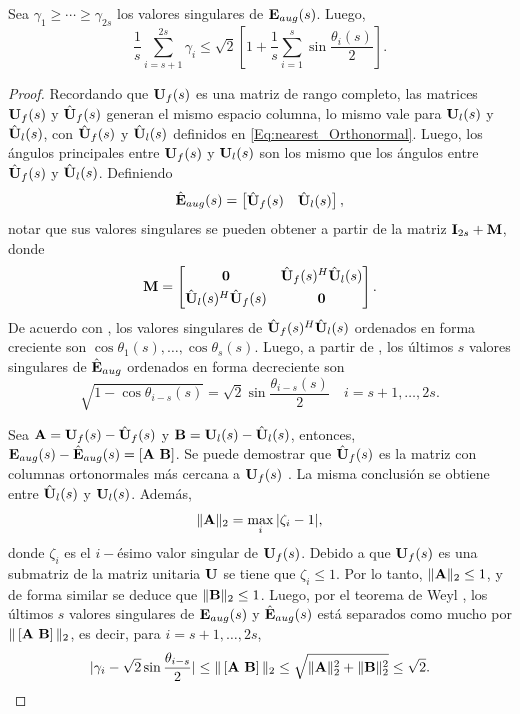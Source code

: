 \begin{theorem}\label{The1:SAMOS}
	Sea $\gamma_1\ge\cdots\ge\gamma_{2s}$ los valores singulares de $\mathbf{E}_{aug}(s)$. Luego,
	\begin{equation}
		\frac{1}{s}\sum_{i=s+1}^{2s}\gamma_i\le \sqrt{2}\left[1+\frac{1}{s}\sum_{i=1}^s\sin\frac{\theta_{i}(s)}{2}\right].
		\label{eq:Angle_Weyl}
	\end{equation}
\end{theorem}
\begin{proof}
	Recordando que $\mathbf{U}_f(s)$ es una matriz de rango completo, las matrices $\mathbf{U}_f(s)$ y $\hat{\mathbf{U}}_f(s)$ generan el mismo espacio columna, lo mismo vale para $\mathbf{U}_l(s)$ y $\hat{\mathbf{U}}_l(s)$, con $\hat{\mathbf{U}}_f(s)$ y $\hat{\mathbf{U}}_l(s)$ definidos en \eqref{Eq:nearest_Orthonormal}. Luego, los ángulos principales entre $\mathbf{U}_f(s)$ y $\mathbf{U}_l(s)$ son los mismo que los ángulos entre $\hat{\mathbf{U}}_f(s)$ y $\hat{\mathbf{U}}_l(s)$. Definiendo
	\begin{equation}
		\hat{\mathbf{E}}_{aug}(s) = \begin{bmatrix} \hat{\mathbf{U}}_f(s) & \hat{\mathbf{U}}_l(s)\end{bmatrix},
	\end{equation}
	notar que sus valores singulares se pueden obtener a partir de la matriz $\mathbf{I}_{2s}+\mathbf{M}$, donde
	\[\mathbf{M} = \begin{bmatrix} \mathbf{0} & \hat{\mathbf{U}}_f(s)^H\hat{\mathbf{U}}_l(s)\\[0.3em] \hat{\mathbf{U}}_l(s)^H\hat{\mathbf{U}}_f(s) & \mathbf{0}
	\end{bmatrix}.\]
	De acuerdo con \cite[Teorema I.5.2]{Stewart1990}, los valores singulares de $\hat{\mathbf{U}}_f(s)^H\hat{\mathbf{U}}_l(s)$ ordenados en forma creciente son $\cos\theta_1(s),\ldots,\cos\theta_s(s)$. Luego, a partir de \cite[Teorema 7.3.3]{Horn1990}, los últimos $s$ valores singulares de $\hat{\mathbf{E}}_{aug}$ ordenados en forma decreciente son
	\[\sqrt{1-\cos\theta_{i-s}(s)} = \sqrt{2}\sin\frac{\theta_{i-s}(s)}{2}\quad i= s+1,\ldots,2s.\]
	
	Sea $\mathbf{A} = \mathbf{U}_f(s) - \hat{\mathbf{U}}_f(s)$ y $\mathbf{B} = \mathbf{U}_l(s) - \hat{\mathbf{U}}_l(s)$, entonces, $\mathbf{E}_{aug}(s) - \hat{\mathbf{E}}_{aug}(s) = \left[ \mathbf{A}\  \mathbf{B}\right]$. Se puede demostrar que $\hat{\mathbf{U}}_f(s)$ es la matriz con columnas ortonormales más cercana a  $\mathbf{U}_f(s)$ \cite{Higham89}. La misma conclusión se obtiene entre $\hat{\mathbf{U}}_l(s)$ y $\mathbf{U}_l(s)$. Además,
	\[\|\mathbf{A}\|_2 = \max_{i}|\zeta_i-1|,\]
	donde $\zeta_i$ es el $i-$ésimo valor singular de $\mathbf{U}_f(s)$. Debido a que $\mathbf{U}_f(s)$ es una submatriz de la matriz unitaria $\mathbf{U}$ se tiene que  $\zeta_i\le 1$. Por lo tanto, $\|\mathbf{A}\|_2\le 1$, y de forma similar se deduce que $\|\mathbf{B}\|_2\le 1$. Luego, por el teorema de Weyl \cite[Teorema 4.11]{Horn1990}, los últimos $s$ valores singulares de $\mathbf{E}_{aug}(s)$ y $\hat{\mathbf{E}}_{aug}(s)$ está separados como mucho por $\|\left[ \mathbf{A}\  \mathbf{B}\right]\|_2$, es decir, para $i = s+1,\ldots, 2s$,
	\begin{equation}
		|\gamma_i -\sqrt{2}\sin\frac{\theta_{i-s}}{2}|\le \|\left[\matA\ \matB\right]\|_2\le \sqrt{\|\matA\|_2^2+\|\matB\|_2^2}\le \sqrt{2}.
	\end{equation}
	

\end{proof}
